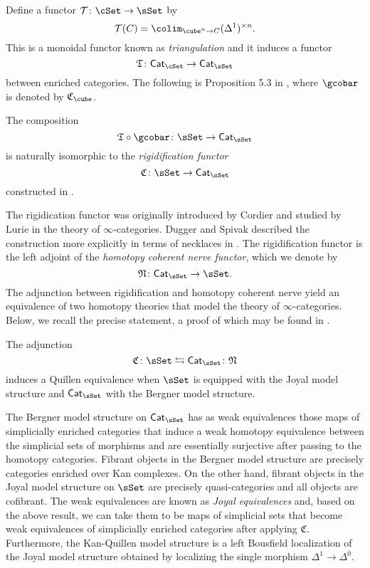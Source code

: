 Define a functor $\mathcal{T} \colon \cSet \to \sSet$ by $$\mathcal{T}(C) = \colim_{\cube^n \to C} (\Delta^1)^{\times n}.$$
This is a monoidal functor known as \textit{triangulation} and it induces a functor $$\mathfrak{T}\colon \mathsf{Cat}_{\cSet} \to \mathsf{Cat}_{\sSet}$$ between enriched categories. The following is Proposition 5.3 in \cite{rivera2018cubical}, where $\gcobar$ is denoted by $\mathfrak{C}_{\cube}$.
\begin{proposition}\label{Candgcobar} The composition 
$$\mathfrak{T} \circ \gcobar \colon \sSet \to \mathsf{Cat}_{\sSet}$$ is naturally isomorphic to the \textit{rigidification functor}
$$\mathfrak{C} \colon \sSet \to \mathsf{Cat}_{\sSet}$$
constructed in \cite{dugger2011rigidification}. 
\end{proposition}
The rigidication functor was originally introduced by Cordier and studied by Lurie in the theory of $\infty$-categories. Dugger and Spivak described the construction more explicitly in terms of necklaces in \cite{dugger2011rigidification}. The rigidification functor is the left adjoint of the \textit{homotopy coherent nerve functor}, which we denote by
$$\mathfrak{N} \colon \mathsf{Cat}_{\sSet} \to \sSet.$$ The adjunction between rigidification and homotopy coherent nerve yield an equivalence of two homotopy theories that model the theory of $\infty$-categories. Below, we recall the precise statement, a proof of which may be found in \cite{dugger2011rigidification}.

\begin{theorem} \label{joyalbergner} The adjunction $$ \mathfrak{C} \colon \sSet \leftrightarrows \mathsf{Cat}_{\sSet} \colon \mathfrak{N}$$ induces a Quillen equivalence when $\sSet$ is equipped with the Joyal model structure and $\mathsf{Cat}_{\sSet}$ with the Bergner model structure.
\end{theorem}


\begin{remark} The Bergner model structure on $\mathsf{Cat}_{\sSet}$ has as weak equivalences those maps of simplicially enriched categories that induce a weak homotopy equivalence between the simplicial sets of morphisms and are essentially surjective after passing to the homotopy categories. Fibrant objects in the Bergner model structure are precisely categories enriched over Kan complexes. On the other hand, fibrant objects in the Joyal model structure on $\sSet$ are precisely quasi-categories and all objects are cofibrant. The weak equivalences are known as \textit{Joyal equivalences} and, based on the above result, we can take them to be maps of simplicial sets that become weak equivalences of simplicially enriched categories after applying $\mathfrak{C}$. Furthermore, the Kan-Quillen model structure is a left Bousfield localization of the Joyal model structure obtained by localizing the single morphism $\Delta^1 \to \Delta^0.$

\end{remark}


